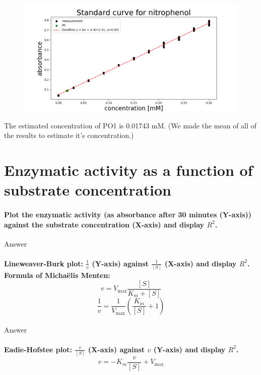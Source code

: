\documentclass[a4paper,12pt]{article}
\begin{document}
\begin{figure}[h]
    \includegraphics[scale=0.5]{fig1.png}
    \centering
\end{figure}

The estimated concentration of PO1 is 0.01743 mM. (We made the mean of all of the results to estimate it's concentration.)

\section{Enzymatic activity as a function of substrate concentration}

\paragraph{Plot the enzymatic activity (as absorbance after 30 minutes (Y-axis)) 
against the substrate concentration (X-axis) and display $R^2$.}

Answer\\

\paragraph{Lineweaver-Burk plot: $\frac{1}{v}$ (Y-axis) against $\frac{1}{[S]}$ (X-axis) and display $R^2$. 
Formula of Michaëlis Menten:\[v=V_{\text{max}}\frac{[S]}{K_m+[S]}\] \[\frac{1}{v}=\frac{1}{V_{\text{max}}}\left(\frac{K_m}{[S]}+1\right)\]}

Answer\\

\paragraph{Eadie-Hofstee plot: $\frac{v}{[S]}$ (X-axis) against $v$ (Y-axis) and display $R^2$. \[v=-K_m\frac{v}{[S]}+V_{\text{max}}\]}
\end{document}
